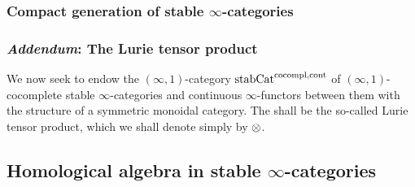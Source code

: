             \subsubsection{Compact generation of stable \texorpdfstring{$\infty$}{}-categories}
                    
            \subsubsection{\textit{Addendum}: The Lurie tensor product}
                We now seek to endow the $(\infty, 1)$-category $\mathrm{stab}\mathrm{Cat}^{\mathrm{co}\mathrm{compl}, \mathrm{cont}}$ of $(\infty, 1)$-cocomplete stable $\infty$-categories and continuous $\infty$-functors between them with the structure of a symmetric monoidal category. The  shall be the so-called Lurie tensor product, which we shall denote simply by $\tensor$. 
    
        \subsection{Homological algebra in stable \texorpdfstring{$\infty$}{}-categories}
